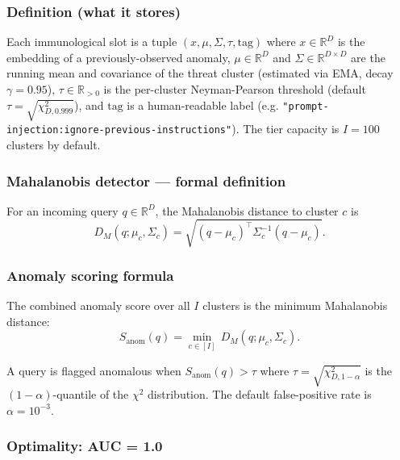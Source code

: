 \documentclass[12pt,a4paper]{article}
\theoremstyle{definition}
\theoremstyle{remark}
\newcommand{\R}{\mathbb{R}}
\begin{document}
\subsubsection{Definition (what it stores)}

Each immunological slot is a tuple $(x, \mu, \Sigma, \tau, \mathrm{tag})$ where $x \in \R^D$ is the embedding of a previously-observed anomaly, $\mu \in \R^D$ and $\Sigma \in \R^{D \times D}$ are the running mean and covariance of the threat cluster (estimated via EMA, decay $\gamma = 0.95$), $\tau \in \R_{>0}$ is the per-cluster Neyman-Pearson threshold (default $\tau = \sqrt{\chi^2_{D, 0.999}}$), and $\mathrm{tag}$ is a human-readable label (e.g. \texttt{"prompt-injection:ignore-previous-instructions"}). The tier capacity is $I = 100$ clusters by default.

\subsubsection{Mahalanobis detector --- formal definition}

For an incoming query $q \in \R^D$, the Mahalanobis distance to cluster $c$ is
\begin{equation}
    D_M(q; \mu_c, \Sigma_c) = \sqrt{(q - \mu_c)^\top \Sigma_c^{-1} (q - \mu_c)}.
\end{equation}

\subsubsection{Anomaly scoring formula}

The combined anomaly score over all $I$ clusters is the minimum Mahalanobis distance:
\begin{equation}
    S_{\mathrm{anom}}(q) = \min_{c \in [I]} \, D_M(q; \mu_c, \Sigma_c).
\end{equation}

A query is flagged anomalous when $S_{\mathrm{anom}}(q) > \tau$ where $\tau = \sqrt{\chi^2_{D, 1 - \alpha}}$ is the $(1-\alpha)$-quantile of the $\chi^2$ distribution. The default false-positive rate is $\alpha = 10^{-3}$.

\subsubsection{Optimality: AUC = 1.0}
\end{document}
